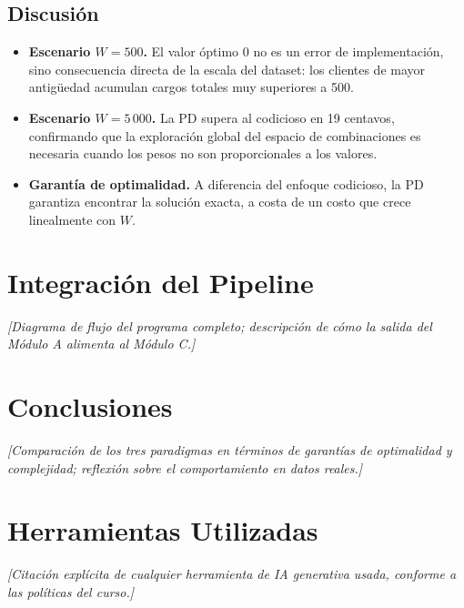 \documentclass[12pt, a4paper]{article}
\begin{document}
\subsection{Discusión}

\begin{itemize}
  \item \textbf{Escenario $W = 500$.} El valor óptimo $0$ no es un error de implementación, sino consecuencia directa de la escala del dataset: los clientes de mayor antigüedad acumulan cargos totales muy superiores a 500.

  \item \textbf{Escenario $W = 5\,000$.} La PD supera al codicioso en 19 centavos, confirmando que la exploración global del espacio de combinaciones es necesaria cuando los pesos no son proporcionales a los valores.

  \item \textbf{Garantía de optimalidad.} A diferencia del enfoque codicioso, la PD garantiza encontrar la solución exacta, a costa de un costo que crece linealmente con $W$.
\end{itemize}

\section{Integración del Pipeline}
\textit{[Diagrama de flujo del programa completo; descripción de cómo la salida del Módulo A alimenta al Módulo C.]}

\section{Conclusiones}
\textit{[Comparación de los tres paradigmas en términos de garantías de optimalidad y complejidad; reflexión sobre el comportamiento en datos reales.]}

\section{Herramientas Utilizadas}
\textit{[Citación explícita de cualquier herramienta de IA generativa usada, conforme a las políticas del curso.]}
\end{document}
